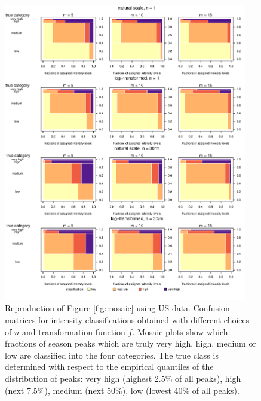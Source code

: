 \documentclass{article}
\begin{document}
\begin{figure}
\includegraphics[width=0.95\textwidth]{figure/mosaic_us.pdf}
\caption{Reproduction of Figure \ref{fig:mosaic} using US data. Confusion matrices for intensity classifications obtained with different choices of $n$ and transformation function $f$. Mosaic plots show which fractions of season peaks which are truly very high, high, medium or low are classified into the four categories. The true class is determined with respect to the empirical quantiles of the distribution of peaks: very high (highest 2.5\% of all peaks), high (next 7.5\%), medium (next 50\%), low (lowest 40\% of all peaks).}
\label{fig:mosaic_us}
\end{figure}
\end{document}
